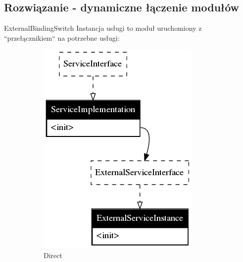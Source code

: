 \documentclass[smaller]{beamer}
\begin{document}
\subsection{Rozwiązanie - dynamiczne łączenie modułów}
\begin{frame}{ExternalBindingSwitch}
Instancja usługi to moduł uruchomiony z ``przełącznikiem`` na potrzebne usługi:
\begin{figure}
        \begin{subfigure}[b]{0.3\textwidth}
                \centering
                \includegraphics[width=\textwidth]{directBinding}
                \caption{Direct}
        \end{subfigure}%
        \begin{subfigure}[b]{0.3\textwidth}
                \centering

\end{subfigure}
\end{figure}
\end{frame}
\end{document}
